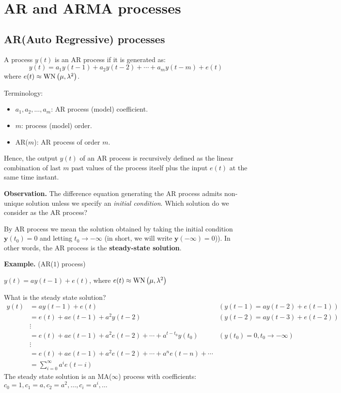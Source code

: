 \section{AR and ARMA processes}

\subsection{AR(Auto Regressive) processes}
A process $y(t)$ is an AR process if it is generated as:
\[
	\boxed{y(t)=a_{1} y(t-1)+a_{2} y(t-2)+\cdots+a_{m} y(t-m)+e(t)}
\]
where $e(t) \approx \operatorname{WN}\left(\mu, \lambda^{2}\right)$.

Terminology:
\begin{itemize}
	\item $a_{1}, a_{2}, \ldots, a_{m}$: AR process (model) coefficient.
	\item $m$: process (model) order.
	\item AR($m$): AR process of order $m$.
\end{itemize}
 
Hence, the output $y(t)$ of an AR process is recursively defined as the linear combination of last $m$ past values of the process itself plus the input $e(t)$ at the same time instant.

\textbf{Observation.}
The difference equation generating the AR process admits non-unique solution unless we specify an \emph{initial condition}. Which solution do we consider as the AR process?

By AR process we mean the solution obtained by taking the initial condition $\boxed{\mathbf{y}(t_{0})=0}$ and letting $t_{0} \to -\infty$ (in short, we will write $\mathbf{y}(-\infty)=0$)). In other words, the AR process is the \textbf{steady-state solution}.

\textbf{Example.} (AR($1$) process)

$y(t)=a y(t-1)+e(t)$, where $e(t) \approx \operatorname{WN}\left(\mu, \lambda^{2}\right)$

What is the steady state solution?
\begin{align*}
	y(t) & =a y(t-1)+e(t) & (y(t-1)=a y(t-2)+e(t-1)) \\
	& =e(t)+a e(t-1)+a^{2} y(t-2) & (y(t-2)=a y(t-3)+e(t-2)) \\
	& \vdots & \\
	& =e(t)+a e(t-1)+a^{2} e(t-2)+\cdots+a^{t-t_{0}} y\left(t_{0}\right) & (y\left(t_{0}\right)=0,t_{0} \to-\infty) \\
	& \vdots & \\
	& =e(t)+a e(t-1)+a^{2} e(t-2)+\cdots+a^{n} e(t-n)+\cdots\\
	&=\sum_{i=0}^{\infty} a^{i} e(t-i)
\end{align*}
The steady state solution is an MA($\infty$) process with coefficients: $c_{0}=1, c_{1}=a, c_{2}=a^{2}, \ldots, c_{i}=a^{i}, \ldots$

